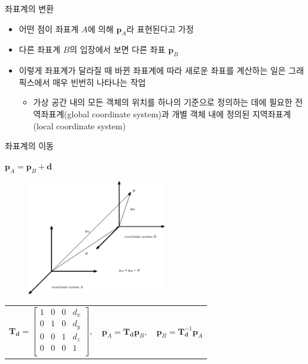 \begin{frame}{좌표계의 변환}


\begin{itemize}
\item 어떤 점이 좌표계 $A$에 의해 $\mathbf p_A$라 표현된다고 가정
\item 다른 좌표계 $B$의 입장에서 보면 다른 좌표 $\mathbf p_B$
\item 이렇게 좌표계가 달라질 때 바뀐 좌표계에 따라 새로운 좌표를 계산하는 일은 그래픽스에서 매우 빈번히 나타나는 작업
	\begin{itemize}
	\item 가상 공간 내의 모든 객체의 위치를 하나의 기준으로 정의하는 데에 필요한 전역좌표계(global coordinate system)과 개별 객체 내에 정의된 지역좌표계(local coordinate system)
	\end{itemize}
\end{itemize}

\end{frame}

\begin{frame}[fragile]{좌표계의 이동}


$\mathbf p_A = \mathbf p_B + \mathbf d$
\begin{figure}
    \includegraphics[width=6cm]{Math_transform/coordinateTranslate.eps}
\end{figure}

\begin{tabular}{lcc}
$
\mathbf T_{\mathbf d} = \left [
\begin{array}{cccc}
1 & 0 & 0 & d_x \\
0 & 1 & 0 & d_y \\
0 & 0 & 1 & d_z \\
0 & 0 & 0 & 1 \\
\end{array}
\right ],
$ &
$\mathbf p_A = \mathbf T_{\mathbf d} \mathbf p_B,$
&
$\mathbf p_B = \mathbf T_{\mathbf d}^{-1} \mathbf p_A$
\end{tabular}

\end{frame}

